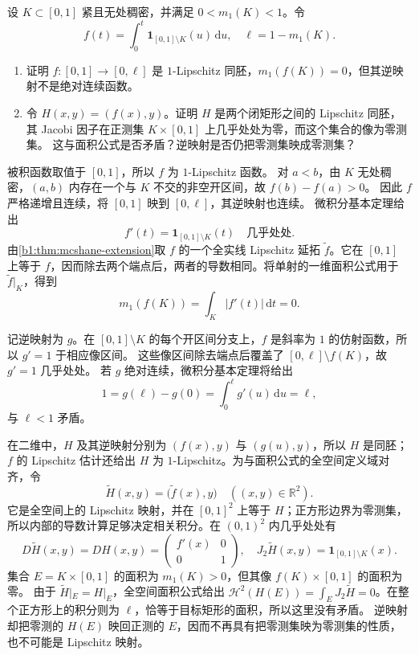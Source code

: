 \begin{optionalexercise}\label{b1:ex:17-singular-lipschitz-homeomorphism}
设 \(K\subset[0,1]\) 紧且无处稠密，并满足 \(0<m_1(K)<1\)。令
\[
 f(t)=\int_0^t\mathbf1_{[0,1]\setminus K}(u)\,\mathrm du,
 \quad \ell=1-m_1(K).
\]
\begin{enumerate}
\item\label{b1:item:17-singular-interval-homeomorphism}
证明 \(f:[0,1]\to[0,\ell]\) 是 \(1\)-Lipschitz 同胚，\(m_1(f(K))=0\)，但其逆映射不是绝对连续函数。
\item\label{b1:item:17-singular-planar-homeomorphism}
令 \(H(x,y)=(f(x),y)\)。证明 \(H\) 是两个闭矩形之间的 Lipschitz 同胚，其 Jacobi 因子在正测集 \(K\times[0,1]\) 上几乎处处为零，而这个集合的像为零测集。
这与面积公式是否矛盾？逆映射是否仍把零测集映成零测集？
\end{enumerate}
\end{optionalexercise}
\begin{solution}
被积函数取值于 \([0,1]\)，所以 \(f\) 为 \(1\)-Lipschitz 函数。
对 \(a<b\)，由 \(K\) 无处稠密，\((a,b)\) 内存在一个与 \(K\) 不交的非空开区间，故 \(f(b)-f(a)>0\)。
因此 \(f\) 严格递增且连续，将 \([0,1]\) 映到 \([0,\ell]\)，其逆映射也连续。
微积分基本定理给出
\[
 f'(t)=\mathbf1_{[0,1]\setminus K}(t)
 \quad\text{几乎处处}.
\]
由\cref{b1:thm:mcshane-extension}取 \(f\) 的一个全实线 Lipschitz 延拓 \(\widetilde f\)。它在 \([0,1]\) 上等于 \(f\)，因而除去两个端点后，两者的导数相同。将单射的一维面积公式用于 \(\widetilde f|_K\)，得到
\[
 m_1(f(K))=\int_K|f'(t)|\,\mathrm dt=0.
\]

记逆映射为 \(g\)。在 \([0,1]\setminus K\) 的每个开区间分支上，\(f\) 是斜率为 \(1\) 的仿射函数，所以 \(g'=1\) 于相应像区间。
这些像区间除去端点后覆盖了 \([0,\ell]\setminus f(K)\)，故 \(g'=1\) 几乎处处。
若 \(g\) 绝对连续，微积分基本定理将给出
\[
 1=g(\ell)-g(0)=\int_0^\ell g'(u)\,\mathrm du=\ell,
\]
与 \(\ell<1\) 矛盾。

在二维中，\(H\) 及其逆映射分别为 \((f(x),y)\) 与 \((g(u),y)\)，所以 \(H\) 是同胚；\(f\) 的 Lipschitz 估计还给出 \(H\) 为 \(1\)-Lipschitz。为与面积公式的全空间定义域对齐，令
\[
 \widetilde H(x,y)=\bigl(\widetilde f(x),y\bigr)
 \quad((x,y)\in\mathbb R^2).
\]
它是全空间上的 Lipschitz 映射，并在 \([0,1]^2\) 上等于 \(H\)；正方形边界为零测集，所以内部的导数计算足够决定相关积分。在 \((0,1)^2\) 内几乎处处有
\[
 D\widetilde H(x,y)=DH(x,y)
 =\begin{pmatrix}f'(x)&0\\0&1\end{pmatrix},
 \quad J_2\widetilde H(x,y)=\mathbf1_{[0,1]\setminus K}(x).
\]
集合 \(E=K\times[0,1]\) 的面积为 \(m_1(K)>0\)，但其像 \(f(K)\times[0,1]\) 的面积为零。
由于 \(\widetilde H|_E=H|_E\)，全空间面积公式给出 \(\mathcal H^2(H(E))=\int_EJ_2\widetilde H=0\)。在整个正方形上的积分则为 \(\ell\)，恰等于目标矩形的面积，所以这里没有矛盾。
逆映射却把零测的 \(H(E)\) 映回正测的 \(E\)，因而不再具有把零测集映为零测集的性质，也不可能是 Lipschitz 映射。
\end{solution}

